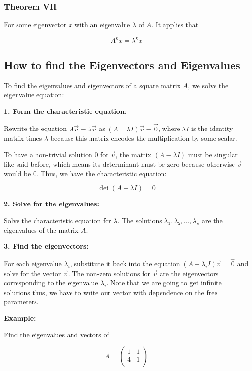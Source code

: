 \subsubsection{Theorem VII}

For some eigenvector \(x\) with an eigenvalue \(\lambda\) of \(A\). It applies that

\[
    A^{k}x = \lambda^{k}x
\]

\subsection{How to find the Eigenvectors and Eigenvalues}

To find the eigenvalues and eigenvectors of a square matrix \(A\), we solve the eigenvalue equation:

\textbf{1. Form the characteristic equation:}

Rewrite the equation \(A\vec{v} = \lambda\vec{v}\) as 
\((A - \lambda I)\vec{v} = \vec{0}\), where \(\lambda I\) is the identity matrix times \(\lambda\) because 
this matrix encodes the multiplication by some scalar. 
    
To have a non-trivial solution \(0\) for \(\vec{v}\), the matrix \((A - \lambda I)\) must be 
singular like said before, which means its determinant must be zero because otherwise \(\vec{v}\) 
would be 0. Thus, we have the characteristic equation:

\[
    \det(A - \lambda I) = 0
\]

\textbf{2. Solve for the eigenvalues:}

Solve the characteristic equation for \(\lambda\). The solutions 
\(\lambda_1, \lambda_2, \dots, \lambda_n\) are the eigenvalues of the matrix \(A\).

\textbf{3. Find the eigenvectors:}

For each eigenvalue \(\lambda_i\), substitute it back into the equation 
\((A - \lambda_i I)\vec{v} = \vec{0}\) and solve for the vector \(\vec{v}\). The non-zero 
solutions for \(\vec{v}\) are the eigenvectors corresponding to the eigenvalue 
\(\lambda_i\). Note that we are going to get infinite solutions thus, we have to write 
our vector with dependence on the free 
parameters.

\textbf{Example:}

Find the eigenvalues and vectors of 

\[
    A = \begin{pmatrix}
        1 & 1 \\
        4 & 1 \\
    \end{pmatrix}
\]

